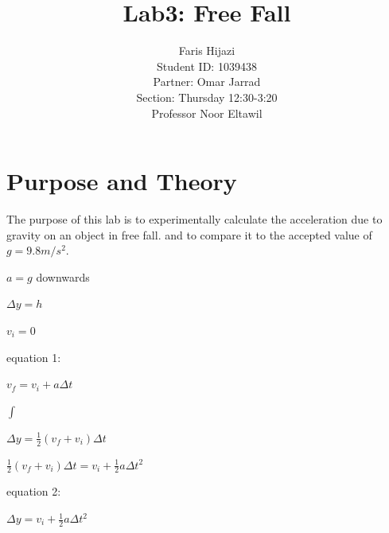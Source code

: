 \documentclass[12pt]{report}
\begin{document}
\title{Lab3: Free Fall}
\author{Faris Hijazi\\
Student ID: 1039438\\
Partner: Omar Jarrad\\
Section: Thursday 12:30-3:20\\
Professor Noor Eltawil}
\maketitle

\section{Purpose and Theory} 
The purpose of this lab is to experimentally calculate the acceleration due to gravity on an object in free fall. and to compare it to the accepted value of $g = 9.8 m/s^2$.\\
\begin{center}
$a = g$ downwards
\end{center}

\begin{center}
$\Delta{}y = h$
\end{center}

\begin{center}
$v_{i} = 0$
\end{center}

\begin{center}
equation 1:
\end{center}

\begin{center}
$v_{f} = v_{i} + a \Delta{}t$
\end{center}

\begin{center}
$\int$
\end{center}

\begin{center}
$\Delta{}y = \frac{1}{2}(v_{f} + v_{i})\Delta{}t$
\end{center}

\begin{center}
$\frac{1}{2}(v_{f} + v_{i})\Delta{}t= v_{i} + \frac{1}{2}a\Delta{}t^2$
\end{center}
\begin{center}
equation 2:
\end{center}

\begin{center}
$\Delta{}y = v_{i} + \frac{1}{2}a\Delta{}t^2$
\end{center}
\end{document}
